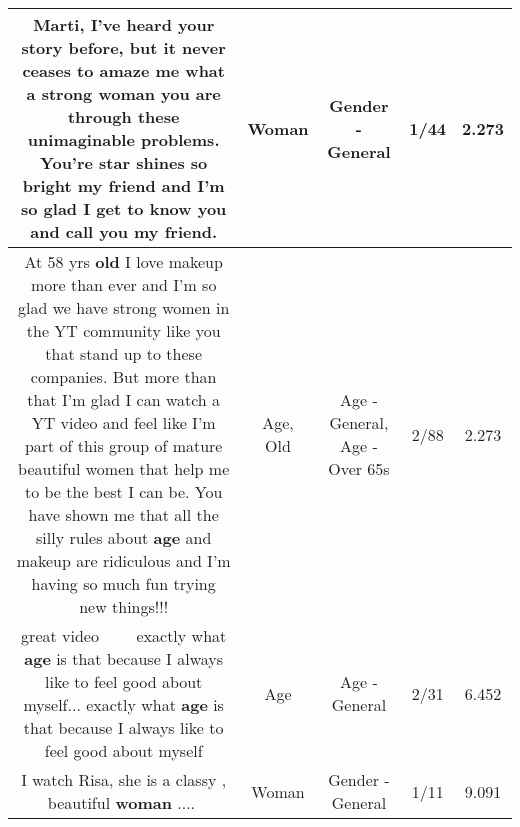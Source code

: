 \documentclass[11pt]{article}
\newlength\mylength
\begin{document}
\begin{center}
\begin{longtable}{|C{.65\mylength}|C{.30\mylength}|C{.12\mylength}|C{.12\mylength}|C{.12\mylength}|}
  \small Marti, I've heard your story before, but it never ceases to amaze me what a strong \textbf{woman} you are through these unimaginable problems.  You're star shines so bright my friend and I'm so glad I get to know you and call you my friend.\normalsize   & Woman & Gender - General & 1/44 & 2.273 \\  \hline
  \small At 58 yrs \textbf{old} I love makeup more than ever and I'm so glad we have strong women in the YT community like you that stand up to these companies.  But more than that I'm glad I can watch a YT video and feel like I'm part of this group of mature beautiful women that help me to be the best I can be.  You have shown me that all the silly rules about \textbf{age} and makeup are ridiculous and I'm having so much fun trying new things!!!\normalsize   & Age, Old & Age - General, Age - Over 65s & 2/88 & 2.273 \\  \hline
  \small great video 💜💕💛💕💙💕 exactly what \textbf{age} is that because I always like to feel good about myself... exactly what \textbf{age} is that because I always like to feel good about myself\normalsize   & Age & Age - General & 2/31 & 6.452 \\  \hline
  \small I watch Risa, she is a classy , beautiful \textbf{woman} ....💜\normalsize   & Woman & Gender - General & 1/11 & 9.091 \\  \hline

\end{longtable}
\end{center}
\end{document}
